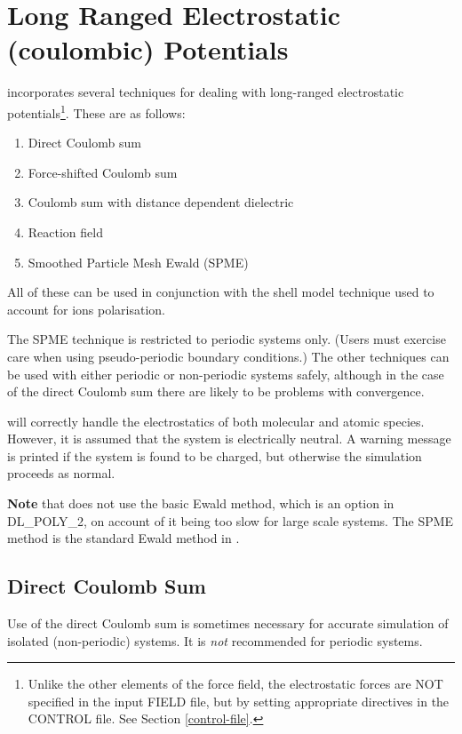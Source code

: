 \section{Long Ranged Electrostatic (coulombic) Potentials}
\label{coulomb}

\D incorporates several techniques for dealing with long-ranged
electrostatic potentials\footnote{Unlike the
other elements of the force field, the electrostatic forces are
NOT specified in the input FIELD file, but by setting appropriate
directives in the CONTROL file. See Section \ref{control-file}.}.
These are as follows:
\begin{enumerate}
\item Direct Coulomb sum
\item Force-shifted Coulomb sum
\item Coulomb sum with distance dependent dielectric
\item Reaction field
\item Smoothed Particle Mesh Ewald (SPME)
\end{enumerate}
All of these can be used in conjunction with the shell
model technique used to
account for ions polarisation.

The SPME technique is restricted to periodic systems only. (Users
must exercise care when using pseudo-periodic boundary
conditions.)  The other techniques can
be used with either periodic or non-periodic systems safely,
although in the case of the direct Coulomb sum there are likely to be problems with convergence.

\D will correctly handle the electrostatics of both molecular and
atomic species.  However, it is assumed that the system is
electrically neutral.  A warning message is printed if the system
is found to be charged, but otherwise the simulation proceeds as
normal.

{\bf Note} that \D does not use the basic Ewald method, which is an
option in DL\_POLY\_2, on account of it being too slow for large
scale systems.  The SPME method is the standard Ewald method in
\D.

\subsection{Direct Coulomb Sum}

Use of the direct Coulomb sum is
sometimes necessary for accurate simulation of isolated
(non-periodic) systems.  It is {\em not} recommended for periodic
systems.

